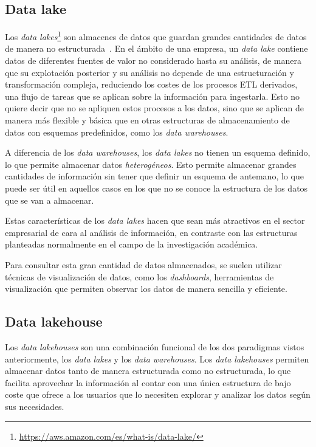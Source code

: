 \subsection{Data lake}\label{sec:lake}
Los \textit{data lakes}\footnote{\url{https://aws.amazon.com/es/what-is/data-lake/}}
son almacenes de datos que guardan grandes cantidades de datos de manera no
estructurada~\cite{mier2023dashboards}. En el ámbito de una empresa, un \textit{data lake}
contiene datos de diferentes fuentes de valor no considerado hasta su análisis, de manera
que su explotación posterior y su análisis no depende de una estructuración y transformación
compleja, reduciendo los costes de los procesos ETL derivados, una flujo de tareas que se
aplican sobre la información para ingestarla. Esto no quiere decir que no se apliquen estos
procesos a los datos, sino que se aplican de manera más flexible y básica que en otras
estructuras de almacenamiento de datos con esquemas predefinidos, como los
\textit{data warehouses}.~\cite{pwint2018data}

A diferencia de los \textit{data warehouses}, los \textit{data lakes} no tienen un
esquema definido, lo que permite almacenar datos \textit{heterogéneos}. Esto permite
almacenar grandes cantidades de información sin tener que definir un esquema de antemano,
lo que puede ser útil en aquellos casos en los que no se conoce la estructura de los
datos que se van a almacenar.

Estas características de los \textit{data lakes} hacen que sean más atractivos en el sector
empresarial de cara al análisis de información, en contraste con las estructuras planteadas
normalmente en el campo de la investigación académica.

Para consultar esta gran cantidad de datos almacenados, se suelen utilizar técnicas de
visualización de datos, como los \textit{dashboards}, herramientas de visualización que
permiten observar los datos de manera sencilla y eficiente.

\subsection{Data lakehouse}\label{sec:lakehouse}
Los \textit{data lakehouses} son una combinación funcional de los dos paradigmas vistos
anteriormente, los \textit{data lakes} y los \textit{data warehouses}. Los \textit{data
lakehouses} permiten almacenar datos tanto de manera estructurada como no estructurada,
lo que facilita aprovechar la información al contar con una única estructura de bajo coste
que ofrece a los usuarios que lo necesiten explorar y analizar los datos según sus necesidades.

